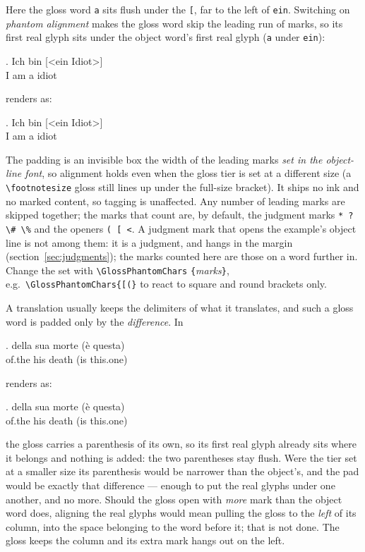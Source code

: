 \documentclass[11pt,a4paper]{article}
\newcommand{\cs}[1]{\texttt{\textbackslash #1}}
\newcommand{\meta}[1]{\textrm{\itshape\textlangle#1\textrangle}}
\newcommand{\marg}[1]{\penalty300 \texttt{\{}\meta{#1}\texttt{\}}}
\newcommand{\rendered}{\par\medskip\noindent\textcolor{gray!70}{\small renders as:}\par\nobreak\smallskip}
\begin{document}
\noindent Here the gloss word \texttt{a} sits flush under the \texttt{[}, far to
the left of \texttt{ein}. Switching on \emph{phantom alignment} makes the
gloss word skip the leading run of marks, so its first real glyph sits under
the object word's first real glyph (\texttt{a} under \texttt{ein}):

\begin{code}
{\GlossPhantomAlign
\ex. \gll Ich bin [<ein Idiot>]\\
I am a idiot\\
}
\end{code}

\rendered
{\GlossPhantomAlign
\ex. \gll Ich bin [<ein Idiot>]\\ I am a idiot\\}

\noindent The padding is an invisible box the width of the leading marks
\emph{set in the object-line font}, so alignment holds even when the gloss
tier is set at a different size (a \cs{footnotesize} gloss still lines up
under the full-size bracket). It ships no ink and no marked content, so
tagging is unaffected. Any number of leading marks are skipped together; the
marks that count are, by default, the judgment marks \verb|* ? \# \%| and the
openers \texttt{(\,[\,<}. A judgment mark that opens the example's object
line is not among them: it is a judgment, and hangs in the margin
(section~\ref{sec:judgments}); the marks counted here are those on a word
further in. Change the set with
\cs{GlossPhantomChars}\marg{marks}, e.g.\ \cs{GlossPhantomChars}\texttt{\{[(\}}
to react to square and round brackets only.

A translation usually keeps the delimiters of what it translates, and such a
gloss word is padded only by the \emph{difference}. In

\begin{code}
{\GlossPhantomAlign
\ex. \gll della sua morte (\`e questa)\\
of.the his death (is this.one)\\
}
\end{code}

\rendered
{\GlossPhantomAlign
\ex. \gll della sua morte (\`e questa)\\ of.the his death (is this.one)\\}

\noindent the gloss carries a parenthesis of its own, so its first real glyph
already sits where it belongs and nothing is added: the two parentheses stay
flush. Were the tier set at a smaller size its parenthesis would be narrower
than the object's, and the pad would be exactly that difference --- enough to
put the real glyphs under one another, and no more. Should the gloss open
with \emph{more} mark than the object word does, aligning the real glyphs
would mean pulling the gloss to the \emph{left} of its column, into the space
belonging to the word before it; that is not done. The gloss keeps the column
and its extra mark hangs out on the left.
\end{document}
